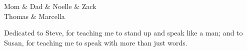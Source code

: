 \documentclass[letterpaper,12pt]{article}
\begin{document}

\listofsymbols
\newpage



\listofabbreviations
\newpage





\begin{acknowledgments}
Mom \& Dad \& Noelle \& Zack \\
Thomas \& Marcella \\

\end{acknowledgments}
\newpage


\begin{dedication}
Dedicated to Steve, for teaching me to stand up and speak like a man; and to Susan, for teaching me to speak with more than just words.
\end{dedication}
\newpage
\end{document}
